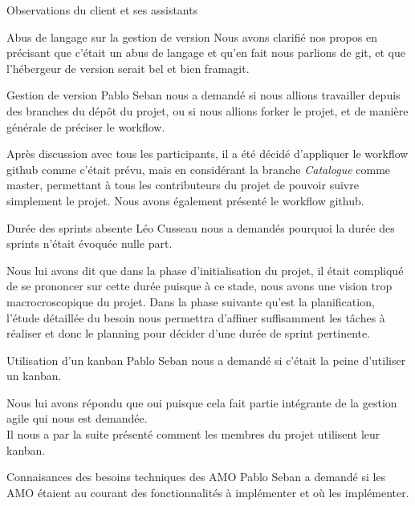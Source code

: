 \documentclass[]{article}
\begin{document}
\begin{section}{Observations du client et ses assistants}
\begin{subsection}{Abus de langage sur la gestion de version}
            Nous avons clarifié nos propos en précisant que c'était un abus de langage et qu'en fait nous parlions de git, et 
            que l'hébergeur de version serait bel et bien framagit.
        \end{subsection}

        \begin{subsection}{Gestion de version}
            Pablo Seban nous a demandé si nous allions travailler depuis des branches du dépôt du projet, ou si nous allions
            forker le projet, et de manière générale de préciser le workflow.

            Après discussion avec tous les participants, il a été décidé d'appliquer le workflow github comme c'était prévu, 
            mais en considérant la branche \emph{Catalogue} comme master, permettant à tous les contributeurs du projet de 
            pouvoir suivre simplement le projet. Nous avons également présenté le workflow github.
        \end{subsection}

        \begin{subsection}{Durée des sprints absente}
            Léo Cusseau nous a demandés pourquoi la durée des sprints n'était évoquée nulle part.

            Nous lui avons dit que dans la phase d'initialisation du projet, il était compliqué de se prononcer sur cette durée 
            puisque à ce stade, nous avons une vision trop macrocroscopique du projet. Dans la phase suivante qu'est la planification, 
            l'étude détaillée du besoin nous permettra d'affiner suffisamment les tâches à réaliser et donc le planning pour 
            décider d'une durée de sprint pertinente.
        \end{subsection}

        \begin{subsection}{Utilisation d'un kanban}
            Pablo Seban nous a demandé si c'était la peine d'utiliser un kanban.

            Nous lui avons répondu que oui puisque cela fait partie intégrante de la gestion agile qui nous est demandée.\\
            Il nous a par la suite présenté comment les membres du projet utilisent leur kanban.
        \end{subsection}

        \begin{subsection}{Connaisances des besoins techniques des AMO}
            Pablo Seban a demandé si les AMO étaient au courant des fonctionnalités à implémenter et où les implémenter.


\end{subsection}
\end{section}
\end{document}
